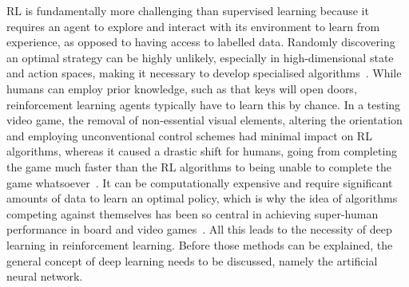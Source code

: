 RL is fundamentally more challenging than supervised learning because it requires an agent to explore and interact with its environment to learn from experience, as opposed to having access to labelled data.
Randomly discovering an optimal strategy can be highly unlikely, especially in high-dimensional state and action spaces, making it necessary to develop specialised algorithms~\autocite{sutton2018}.
While humans can employ prior knowledge, such as that keys will open doors, reinforcement learning agents typically have to learn this by chance.
In a testing video game, the removal of non-essential visual elements, altering the orientation and employing unconventional control schemes had minimal impact on RL algorithms, whereas it caused a drastic shift for humans, going from completing the game much faster than the RL algorithms to being unable to complete the game whatsoever~\autocite{dubey2018}.
It can be computationally expensive and require significant amounts of data to learn an optimal policy, which is why the idea of algorithms competing against themselves has been so central in achieving super-human performance in board and video games~\autocite{silver2016}.
All this leads to the necessity of deep learning in reinforcement learning.
Before those methods can be explained, the general concept of deep learning needs to be discussed, namely the artificial neural network.